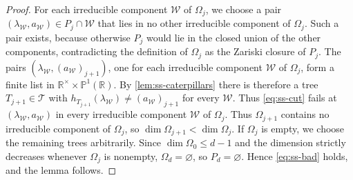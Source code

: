 \documentclass[11pt,a4paper]{article}
\theoremstyle{plain}
\theoremstyle{definition}
\newcommand{\R}{\mathbb{R}}
\begin{document}
\begin{proof}
For each irreducible component $\mathcal W$ of $\Omega_j$, we choose a pair
$(\lambda_{\mathcal W},a_{\mathcal W})\in P_j\cap\mathcal W$ that lies in no other irreducible component
of $\Omega_j$.
Such a pair exists, because otherwise $P_j$ would lie in the closed
union of the other components, contradicting the definition of
$\Omega_j$ as the Zariski closure of $P_j$.
The pairs $(\lambda_{\mathcal W},(a_{\mathcal W})_{j+1})$, one for each irreducible component
$\mathcal W$ of $\Omega_j$, form a finite list in
$\R^\times\times\mathbb P^1(\R)$.
By \cref{lem:ss-caterpillars} there is therefore a tree
$T_{j+1}\in\mathcal T$ with
$h_{T_{j+1}}(\lambda_{\mathcal W})\ne(a_{\mathcal W})_{j+1}$ for every $\mathcal W$.
Thus \cref{eq:ss-cut} fails at $(\lambda_{\mathcal W},a_{\mathcal W})$ in every irreducible
component $\mathcal W$ of $\Omega_j$.
Thus $\Omega_{j+1}$ contains no irreducible component of $\Omega_j$,
so $\dim\Omega_{j+1}<\dim\Omega_j$.
If $\Omega_j$ is empty, we choose the remaining trees arbitrarily.
Since $\dim\Omega_0\le d-1$ and the dimension strictly decreases
whenever $\Omega_j$ is nonempty, $\Omega_d=\varnothing$, so $P_d=\varnothing$.
Hence \cref{eq:ss-bad} holds, and the lemma follows.
\end{proof}
\end{document}
